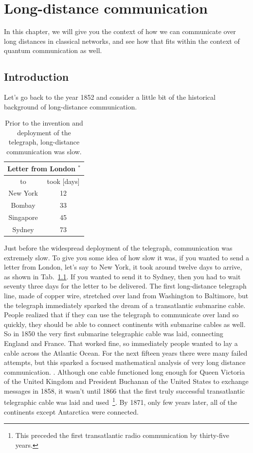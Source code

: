 \chapter{Long-distance communication}
\label{sec:11_long-distance}

In this chapter, we will give you the context of how we can communicate over long distances in classical networks, and see how that fits within the context of quantum communication as well.

\section{Introduction}
\label{sec:ld-intro}


Let's go back to the year 1852 and consider a little bit of the historical background of long-distance communication.

\begin{table}
\centering
\begin{tabular}{|c|c|}
\hline \multicolumn{2}{|c|}{ Letter from London ${ }^*$} \\
\hline to & took [days] \\
\hline New York & 12 \\
Bombay & 33 \\
Singapore & 45 \\
Sydney & 73 \\
\hline
\end{tabular}
\caption{Prior to the invention and deployment of the telegraph, long-distance communication was slow.}
\label{tab:london-letter}
\end{table}

Just before the widespread deployment of the telegraph, communication was extremely slow. To give you some idea of how slow it was, if you wanted to send a letter from London, let's say to New York, it took around twelve days to arrive, as shown in Tab.~\ref{tab:london-letter}. If you wanted to send it to Sydney, then you had to wait seventy three days for the letter to be delivered. The first long-distance telegraph line, made of copper wire, stretched over land from Washington to Baltimore, but the telegraph immediately sparked the dream of a transatlantic submarine cable. People realized that if they can use the telegraph to communicate over land so quickly, they should be able to connect continents with submarine cables as well. So in 1850 the very first submarine telegraphic cable was laid, connecting England and France. That worked fine, so immediately people wanted to lay a cable across the Atlantic Ocean. For the next fifteen years there were many failed attempts, but this sparked a focused mathematical analysis of very long distance communication. . Although one cable functioned long enough for Queen Victoria of the United Kingdom and President Buchanan of the United States to exchange messages in 1858, it wasn't until 1866 that the first truly successful transatlantic telegraphic cable was laid and used~\footnote{This preceded the first transatlantic radio communication by thirty-five years.}. By 1871, only few years later, all of the continents except Antarctica were connected.

